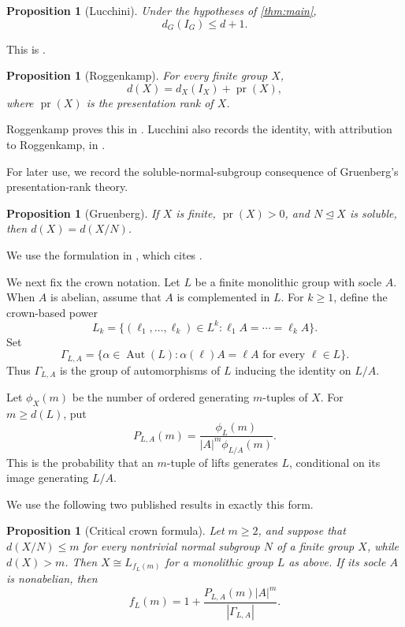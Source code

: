 \documentclass[11pt,reqno]{amsart}
\newtheorem{proposition}[theorem]{Proposition}
\theoremstyle{remark}
\DeclareMathOperator{\Aut}{Aut}
\DeclareMathOperator{\pr}{pr}
\newcommand{\GammaLA}{\Gamma_{L,A}}
\begin{document}
\begin{proposition}[Lucchini]\label{prop:augmentation}
Under the hypotheses of \cref{thm:main},
\[
 d_G(I_G)\leq d+1.
\]
\end{proposition}

This is \cite[Theorem~2 and Proposition~2]{Lucchini1992}.

\begin{proposition}[Roggenkamp]\label{prop:presentation-rank}
For every finite group $X$,
\[
 d(X)=d_X(I_X)+\pr(X),
\]
where $\pr(X)$ is the presentation rank of $X$.
\end{proposition}

Roggenkamp proves this in \cite[Theorem~2.1]{Roggenkamp1979}.
Lucchini also records the identity, with attribution to Roggenkamp, in
\cite[p.~146]{Lucchini1992}.

For later use, we record the soluble-normal-subgroup consequence of
Gruenberg's presentation-rank theory.

\begin{proposition}[Gruenberg]\label{prop:pr}
If $X$ is finite, $\pr(X)>0$, and $N\unlhd X$ is soluble, then
$d(X)=d(X/N)$.
\end{proposition}

We use the formulation in \cite[2.1, p.~209]{Lucchini1990}, which cites
\cite[p.~218]{Gruenberg1976}.

We next fix the crown notation.  Let $L$ be a finite monolithic group with
socle $A$.  When $A$ is abelian, assume that $A$ is complemented in $L$.
For $k\geq 1$, define the crown-based power
\[
 L_k=\{(\ell_1,\ldots,\ell_k)\in L^k:
          \ell_1A=\cdots=\ell_kA\}.
\]
Set
\[
 \GammaLA=
 \{\alpha\in\Aut(L):\alpha(\ell)A=\ell A\text{ for every }\ell\in L\}.
\]
Thus $\GammaLA$ is the group of automorphisms of $L$ inducing the identity
on $L/A$.

Let $\phi_X(m)$ be the number of ordered generating $m$-tuples of $X$.
For $m\geq d(L)$, put
\[
 P_{L,A}(m)=
 \frac{\phi_L(m)}{|A|^m\phi_{L/A}(m)}.
\]
This is the probability that an $m$-tuple of lifts generates $L$, conditional
on its image generating $L/A$.

We use the following two published results in exactly this form.

\begin{proposition}[Critical crown formula]\label{prop:crown}
Let $m\geq2$, and suppose that $d(X/N)\leq m$ for every nontrivial normal
subgroup $N$ of a finite group $X$, while $d(X)>m$.  Then
$X\cong L_{f_L(m)}$ for a monolithic group $L$ as above.  If its socle $A$
is nonabelian, then
\begin{equation}\label{eq:crown-formula}
 f_L(m)=1+\frac{P_{L,A}(m)|A|^m}{|\GammaLA|}.
\end{equation}
\end{proposition}
\end{document}
